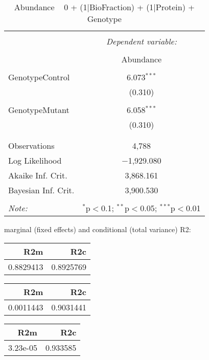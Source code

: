 \documentclass[11pt]{report}
\begin{document}
\begin{table}[!htbp] \centering 
  \caption{Abundance ~ 0 + (1|BioFraction) + (1|Protein) + Genotype} 
  \label{} 
\begin{tabular}{@{\extracolsep{5pt}}lc} 
\\[-1.8ex]\hline 
\hline \\[-1.8ex] 
 & \multicolumn{1}{c}{\textit{Dependent variable:}} \\ 
\cline{2-2} 
\\[-1.8ex] & Abundance \\ 
\hline \\[-1.8ex] 
 GenotypeControl & 6.073$^{***}$ \\ 
  & (0.310) \\ 
  & \\ 
 GenotypeMutant & 6.058$^{***}$ \\ 
  & (0.310) \\ 
  & \\ 
\hline \\[-1.8ex] 
Observations & 4,788 \\ 
Log Likelihood & $-$1,929.080 \\ 
Akaike Inf. Crit. & 3,868.161 \\ 
Bayesian Inf. Crit. & 3,900.530 \\ 
\hline 
\hline \\[-1.8ex] 
\textit{Note:}  & \multicolumn{1}{r}{$^{*}$p$<$0.1; $^{**}$p$<$0.05; $^{***}$p$<$0.01} \\ 
\end{tabular} 
\end{table} 
marginal (fixed effects) and conditional (total variance) R2:

\begin{tabular}{r|r}
\hline
R2m & R2c\\
\hline
0.8829413 & 0.8925769\\
\hline
\end{tabular}

\begin{tabular}{r|r}
\hline
R2m & R2c\\
\hline
0.0011443 & 0.9031441\\
\hline
\end{tabular}

\begin{tabular}{r|r}
\hline
R2m & R2c\\
\hline
3.23e-05 & 0.933585\\
\hline
\end{tabular}
\end{document}
